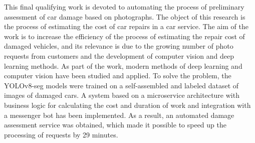 This final qualifying work is devoted to automating the process of preliminary assessment of car damage based on photographs. The object of this research is the process of estimating the cost of car repairs in a car service. The aim of the work is to increase the efficiency of the process of estimating the repair cost of damaged vehicles, and its relevance is due to the growing number of photo requests from customers and the development of computer vision and deep learning methods.
As part of the work, modern methods of deep learning and computer vision have been studied and applied. To solve the problem, the YOLOv8-seg models were trained on a self-assembled and labeled dataset of images of damaged cars. A system based on a microservice architecture with business logic for calculating the cost and duration of work and integration with a messenger bot has been implemented. As a result, an automated damage assessment service was obtained, which made it possible to speed up the processing of requests by 29 minutes.
